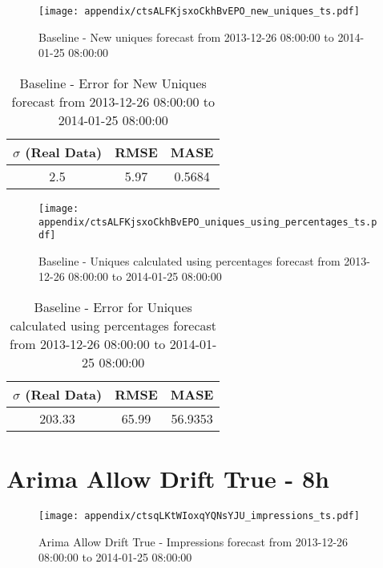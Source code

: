 \begin{figure}[H] \begin{center} \leavevmode
\texttt{[image: appendix/ctsALFKjsxoCkhBvEPO\_new\_uniques\_ts.pdf]} \caption{
Baseline - New uniques forecast from 2013-12-26 08:00:00 to 2014-01-25 08:00:00} \label{fig:appendix/ctsALFKjsxoCkhBvEPO_new_uniques_ts.pdf} \end{center}
\end{figure}

\begin{table}[H]
\centering
\footnotesize
\begin{tabular}{ccc}
$\sigma$ (Real Data) & RMSE & MASE   \\ \hline
2.5 & 5.97 & 0.5684 \\
\end{tabular}

\vspace{0.5cm}

\caption{
Baseline - Error for New Uniques forecast from 2013-12-26 08:00:00 to 2014-01-25 08:00:00}
\end{table}

\begin{figure}[H] \begin{center} \leavevmode
\texttt{[image: appendix/ctsALFKjsxoCkhBvEPO\_uniques\_using\_percentages\_ts.pdf]} \caption{
Baseline - Uniques calculated using percentages forecast from 2013-12-26 08:00:00 to 2014-01-25 08:00:00} \label{fig:appendix/ctsALFKjsxoCkhBvEPO_uniques_using_percentages_ts.pdf} \end{center}
\end{figure}

\begin{table}[H]
\centering
\footnotesize
\begin{tabular}{ccc}
$\sigma$ (Real Data) & RMSE & MASE   \\ \hline
203.33 & 65.99 & 56.9353 \\
\end{tabular}

\vspace{0.5cm}

\caption{
Baseline - Error for Uniques calculated using percentages forecast from 2013-12-26 08:00:00 to 2014-01-25 08:00:00}
\end{table}

\section{Arima Allow Drift True - 8h}
\begin{figure}[H] \begin{center} \leavevmode
\texttt{[image: appendix/ctsqLKtWIoxqYQNsYJU\_impressions\_ts.pdf]} \caption{
Arima Allow Drift True - Impressions forecast from 2013-12-26 08:00:00 to 2014-01-25 08:00:00} \label{fig:appendix/ctsqLKtWIoxqYQNsYJU_impressions_ts.pdf} \end{center}
\end{figure}

